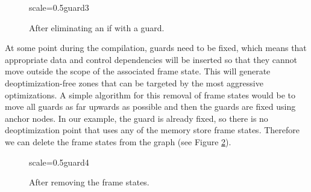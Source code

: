\documentclass[twocolumn]{svjour3}
\begin{document}
\begin{figure}[ht]
  \centering
\begin{digraphenv}{scale=0.5}{guard3}
\end{digraphenv}
  \caption{After eliminating an if with a guard.}
  \label{fig:guard3}
\end{figure}

At some point during the compilation, guards need to be fixed, which means that appropriate data and control dependencies will be inserted so that they cannot move outside the scope of the associated frame state.
This will generate deoptimization-free zones that can be targeted by the most aggressive optimizations.
A simple algorithm for this removal of frame states would be to move all guards as far upwards as possible and then the guards are fixed using anchor nodes.
In our example, the guard is already fixed, so there is no deoptimization point that uses any of the memory store frame states.
Therefore we can delete the frame states from the graph (see Figure \ref{fig:guard4}).

\begin{figure}[ht]
  \centering
\begin{digraphenv}{scale=0.5}{guard4}
\end{digraphenv}
  \caption{After removing the frame states.}
  \label{fig:guard4}
\end{figure}
\end{document}
